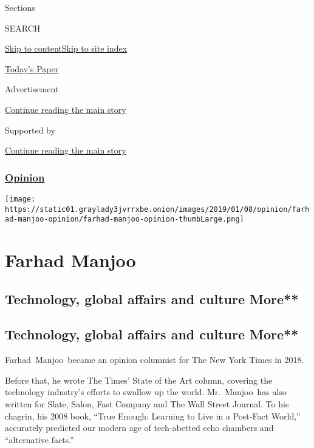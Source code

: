 Sections

SEARCH

\protect\hyperlink{site-content}{Skip to
content}\protect\hyperlink{site-index}{Skip to site index}

\href{https://myaccount.nytimes3xbfgragh.onion/auth/login?response_type=cookie\&client_id=vi}{}

\href{https://www.nytimes3xbfgragh.onion/section/todayspaper}{Today's
Paper}

Advertisement

\protect\hyperlink{after-top}{Continue reading the main story}

Supported by

\protect\hyperlink{after-sponsor}{Continue reading the main story}

\hypertarget{opinion}{%
\subsubsection{\texorpdfstring{\href{/section/opinion}{Opinion}}{Opinion}}\label{opinion}}

\texttt{[image: https://static01.graylady3jvrrxbe.onion/images/2019/01/08/opinion/farhad-manjoo-opinion/farhad-manjoo-opinion-thumbLarge.png]}

\hypertarget{farhad-manjoo}{%
\section{Farhad Manjoo}\label{farhad-manjoo}}

\hypertarget{technology-global-affairs-and-culture-more}{%
\subsection{Technology, global affairs and culture
More**}\label{technology-global-affairs-and-culture-more}}

\hypertarget{technology-global-affairs-and-culture-more-1}{%
\subsection{Technology, global affairs and culture
More**}\label{technology-global-affairs-and-culture-more-1}}

Farhad~Manjoo~became an opinion columnist for The New York Times in
2018.~

Before that, he wrote The Times' State of the Art column, covering the
technology industry's efforts to swallow up the world. Mr.~Manjoo~has
also written for Slate, Salon, Fast Company and The Wall Street Journal.
To his chagrin, his 2008 book, ``True Enough: Learning to Live in a
Post-Fact World,'' accurately predicted our modern age of tech-abetted
echo chambers and ``alternative facts.''

